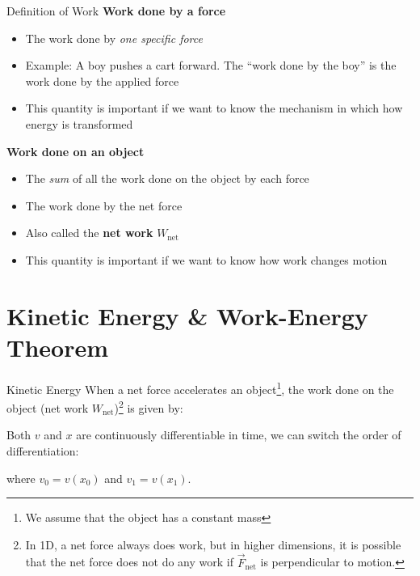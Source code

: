 \documentclass[12pt,compress,aspectratio=169]{beamer}
\begin{document}
\begin{frame}{Definition of Work}
  \textbf{Work done by a force}
  \begin{itemize}
  \item The work done by \emph{one specific force}
  \item Example: A boy pushes a cart forward. The ``work done by the boy'' is
    the work done by the applied force
  \item This quantity is important if we want to know the mechanism in which
    how energy is transformed
  \end{itemize}

  \vspace{.15in}\textbf{Work done on an object}
  \begin{itemize}
  \item The \emph{sum} of all the work done on the object by each force
  \item The work done by the net force
  \item Also called the \textbf{net work} $W_\text{net}$
  \item This quantity is important if we want to know how work changes motion
  \end{itemize}
\end{frame}



\section{Kinetic Energy \& Work-Energy Theorem}

\begin{frame}{Kinetic Energy}
  When a net force accelerates an object\footnote{We assume that the object has
  a constant mass}, the work done on the object (net work
  $W_\text{net}$)\footnote{In 1D, a net force always does work, but in higher
  dimensions, it is possible that the net force does not do any work if
  $\vec F_\text{net}$ is perpendicular to motion.} is given by:


  Both $v$ and $x$ are continuously differentiable in time, we can switch the
  order of differentiation:
  
  where $v_0=v(x_0)$ and $v_1=v(x_1)$.
  \vspace{.2in}
\end{frame}
\end{document}

